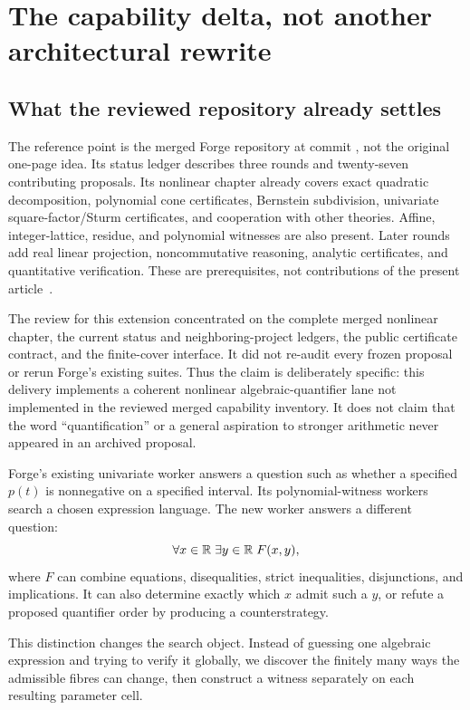 \section{The capability delta, not another architectural rewrite}
\label{sec:delta}
\subsection{What the reviewed repository already settles}
The reference point is the merged Forge repository at commit \repo{}, not the original one-page idea. Its status ledger describes three rounds and twenty-seven contributing proposals. Its nonlinear chapter already covers exact quadratic decomposition, polynomial cone certificates, Bernstein subdivision, univariate square-factor/Sturm certificates, and cooperation with other theories. Affine, integer-lattice, residue, and polynomial witnesses are also present. Later rounds add real linear projection, noncommutative reasoning, analytic certificates, and quantitative verification. These are prerequisites, not contributions of the present article~\cite{forge-status,forge-nonlinear}.

The review for this extension concentrated on the complete merged nonlinear chapter, the current status and neighboring-project ledgers, the public certificate contract, and the finite-cover interface. It did not re-audit every frozen proposal or rerun Forge's existing suites. Thus the claim is deliberately specific: this delivery implements a coherent nonlinear algebraic-quantifier lane not implemented in the reviewed merged capability inventory. It does not claim that the word ``quantification'' or a general aspiration to stronger arithmetic never appeared in an archived proposal.

Forge's existing univariate worker answers a question such as whether a specified $p(t)$ is nonnegative on a specified interval. Its polynomial-witness workers search a chosen expression language. The new worker answers a different question:
\begin{equation}\label{eq:main-goal}
  \forall x\in\mathbb R\;\exists y\in\mathbb R\;F(x,y),
\end{equation}
where $F$ can combine equations, disequalities, strict inequalities, disjunctions, and implications. It can also determine exactly which $x$ admit such a $y$, or refute a proposed quantifier order by producing a counterstrategy.

This distinction changes the search object. Instead of guessing one algebraic expression and trying to verify it globally, we discover the finitely many ways the admissible fibres can change, then construct a witness separately on each resulting parameter cell.

